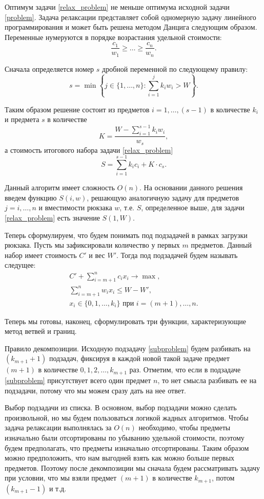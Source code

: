 \documentclass[12pt, a4paper]{article}
\begin{document}
Оптимум задачи \eqref{relax_problem} не меньше оптимума исходной задачи \eqref{problem}. Задача релаксации представляет собой одномерную задачу линейного программирования и может быть решена методом Данцига следующим образом. Переменные нумеруются в порядке возрастания удельной стоимости:
\[
\frac{c_1}{w_1} \ge \dots \ge \frac{c_n}{w_n}.
\]

Сначала определяется номер $s$ дробной переменной по следующему правилу:
\[
s = \min \left\{j \in \{1,\dots, n\} : \sum_{i=1}^j k_i w_i > W \right\}.
\]

Таким образом решение состоит из предметов $i = 1, \dots, (s-1)$ в количестве $k_i$ и предмета $s$ в количестве
\[
K = \frac{W - \sum\limits_{i=1}^{s-1} k_i w_i}{w_s},
\]
а стоимость итогового набора задачи \eqref{relax_problem}
\[
S = \sum_{i=1}^{s-1} k_i c_i + K\cdot c_s.
\]

Данный алгоритм имеет сложность $O(n)$. На основании данного решения введем функцию $S(i, w)$, решающую аналогичную задачу для предметов $j = i,\dots, n$ и вместимости рюкзака $w$, т.е. $S$, определенное выше, для задачи \eqref{relax_problem} есть значение $S(1, W)$.

Теперь сформулируем, что будем понимать под подзадачей в рамках загрузки рюкзака. Пусть мы зафиксировали количество у первых $m$ предметов. Данный набор имеет стоимость $C'$ и вес $W'$. Тогда под подзадачей будем называть следущее:
\begin{equation}
	\label{subproblem}
	\begin{gathered}
		C' + \sum_{i=m+1}^{n} c_i x_i \rightarrow \max, \\
		\sum_{i=m+1}^{n} w_i x_i \le W - W', \\
		x_i \in \{0,1,\dots,k_i\} \textrm{ при } i=(m+1),\dots, n.
	\end{gathered}
\end{equation}

Теперь мы готовы, наконец, сформулировать три функции, характеризующие метод ветвей и границ.

Правило декомпозиции. Исходную подзадачу \eqref{subproblem} будем разбивать на $(k_{m+1}+1)$ подзадач, фиксируя в каждой новой такой задаче предмет $(m + 1)$ в количестве $0, 1, 2, \dots, k_{m+1}$ раз. Отметим, что если в подзадаче \eqref{subproblem} присутствует всего один предмет $n$, то нет смысла разбивать ее на подзадачи, потому что мы можем сразу дать на нее ответ.

Выбор подзадачи из списка. В основном, выбор подзадачи можно сделать произвольной, но мы будем пользоваться логикой жадных алгоритмов. Чтобы задача релаксации выполнялась за $O(n)$ необходимо, чтобы предметы изначально были отсортированы по убыванию удельной стоимости, поэтому будем предполагать, что предметы изначально отсортированы. Таким образом можно предположить, что нам выгодней взять как можно больше первых предметов. Поэтому после декомпозиции мы сначала будем рассматривать задачу при условии, что мы взяли предмет $(m+1)$ в количестве $k_{m+1}$, потом $(k_{m+1} - 1)$ и т.д.
\end{document}
